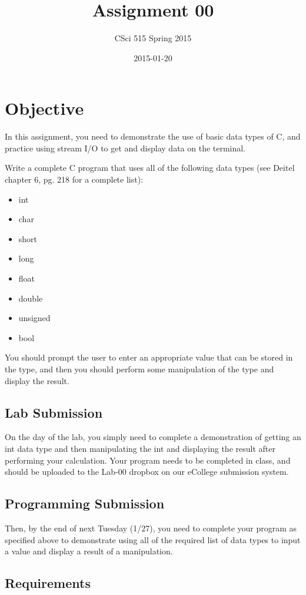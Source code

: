 \documentclass[11pt]{article}
\title{Assignment 00}
\author{CSci 515 Spring 2015}
\date{2015-01-20}
\begin{document}
\maketitle

\section*{Objective}
\label{sec-1}


In this assignment, you need to demonstrate the use of basic data
types of C, and practice using stream I/O to get and display data on
the terminal.

Write a complete C program that uses all of the following data types
(see Deitel chapter 6, pg. 218 for a complete list):

\begin{itemize}
\item int
\item char
\item short
\item long
\item float
\item double
\item unsigned
\item bool
\end{itemize}

You should prompt the user to enter an appropriate value that can be
stored in the type, and then you should perform some manipulation of
the type and display the result.
\subsection*{Lab Submission}
\label{sec-1-1}

On the day of the lab, you simply need to complete a demonstration of
getting an int data type and then manipulating the int and displaying
the result after performing your calculation.  Your program needs to
be completed in class, and should be uploaded to the Lab-00 dropbox on
our eCollege submission system.
\subsection*{Programming Submission}
\label{sec-1-2}

Then, by the end of next Tuesday (1/27), you need to complete your
program as specified above to demonstrate using all of the required
list of data types to input a value and display a result of a
manipulation.
\subsection*{Requirements}
\label{sec-1-3}
\end{document}

